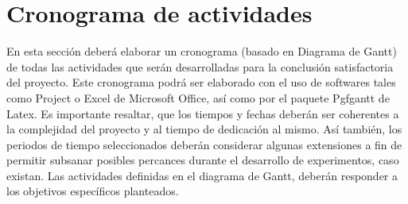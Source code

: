 \section{Cronograma de actividades}
En esta sección deberá elaborar un cronograma (basado en Diagrama de Gantt) de todas las actividades que serán desarrolladas para la conclusión satisfactoria del proyecto. 
Este cronograma podrá ser elaborado con el uso de softwares tales como Project o Excel de Microsoft Office, así como por el paquete Pgfgantt de Latex.
Es importante resaltar, que los tiempos y fechas deberán ser coherentes a la complejidad del proyecto y al tiempo de dedicación al mismo. Así también, los periodos de tiempo seleccionados deberán considerar algunas extensiones a fin de permitir subsanar posibles percances durante el desarrollo de experimentos, caso existan.
Las actividades definidas en el diagrama de Gantt, deberán responder a los objetivos específicos planteados.
